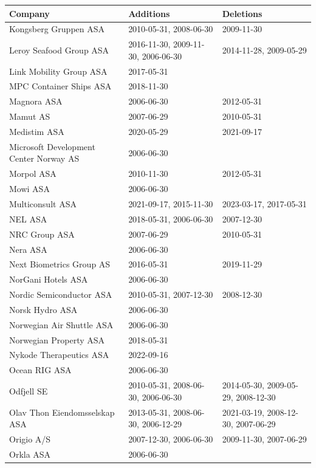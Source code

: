 \begin{table}[H]
\centering
\begin{tabularx}{\textwidth}{XXX}
\toprule
Company & Additions & Deletions \\ 
\midrule
Kongsberg Gruppen ASA & 2010-05-31, 2008-06-30 & 2009-11-30 \\ 
Leroy Seafood Group ASA & 2016-11-30, 2009-11-30, 2006-06-30 & 2014-11-28, 2009-05-29 \\ 
Link Mobility Group ASA & 2017-05-31 &  \\ 
MPC Container Ships ASA & 2018-11-30 &  \\ 
Magnora ASA & 2006-06-30 & 2012-05-31 \\ 
Mamut AS & 2007-06-29 & 2010-05-31 \\ 
Medistim ASA & 2020-05-29 & 2021-09-17 \\ 
Microsoft Development Center Norway AS & 2006-06-30 &  \\ 
Morpol ASA & 2010-11-30 & 2012-05-31 \\ 
Mowi ASA & 2006-06-30 &  \\ 
Multiconsult ASA & 2021-09-17, 2015-11-30 & 2023-03-17, 2017-05-31 \\ 
NEL ASA & 2018-05-31, 2006-06-30 & 2007-12-30 \\ 
NRC Group ASA & 2007-06-29 & 2010-05-31 \\ 
Nera ASA & 2006-06-30 &  \\ 
Next Biometrics Group AS & 2016-05-31 & 2019-11-29 \\ 
NorGani Hotels ASA & 2006-06-30 &  \\ 
Nordic Semiconductor ASA & 2010-05-31, 2007-12-30 & 2008-12-30 \\ 
Norsk Hydro ASA & 2006-06-30 &  \\ 
Norwegian Air Shuttle ASA & 2006-06-30 &  \\ 
Norwegian Property ASA & 2018-05-31 &  \\ 
Nykode Therapeutics ASA & 2022-09-16 &  \\ 
Ocean RIG ASA & 2006-06-30 &  \\ 
Odfjell SE & 2010-05-31, 2008-06-30, 2006-06-30 & 2014-05-30, 2009-05-29, 2008-12-30 \\ 
Olav Thon Eiendomsselskap ASA & 2013-05-31, 2008-06-30, 2006-12-29 & 2021-03-19, 2008-12-30, 2007-06-29 \\ 
Origio A/S & 2007-12-30, 2006-06-30 & 2009-11-30, 2007-06-29 \\ 
Orkla ASA & 2006-06-30 &  \\ 

\end{tabularx}
\end{table}
